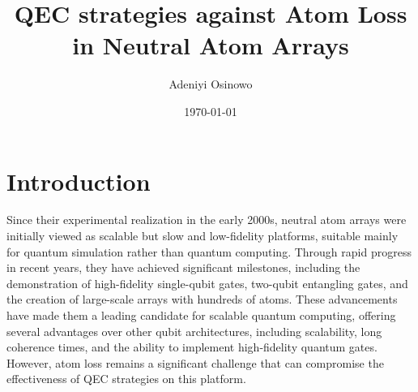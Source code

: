 \documentclass[aps,prb,twocolumn,superscriptaddress,nobibnotes]{revtex4-2} %
\begin{document}
\title{QEC strategies against Atom Loss in Neutral Atom Arrays}
\author{Adeniyi Osinowo}
\date{\today}
\begin{abstract}
\end{abstract}
\maketitle

\section{Introduction} %
Since their experimental realization in the early 2000s, neutral atom arrays were initially viewed as scalable but slow and low-fidelity platforms, suitable mainly for quantum simulation rather than quantum computing.
Through rapid progress in recent years, they have achieved significant milestones, including the demonstration of high-fidelity single-qubit gates, two-qubit entangling gates, and the creation of large-scale arrays with hundreds of atoms.
These advancements have made them a leading candidate for scalable quantum computing, offering several advantages over other qubit architectures, including scalability, long coherence times, and the ability to implement high-fidelity quantum gates.
However, atom loss remains a significant challenge that can compromise the effectiveness of QEC strategies on this platform.
\vspace{8pt}
\end{document}
